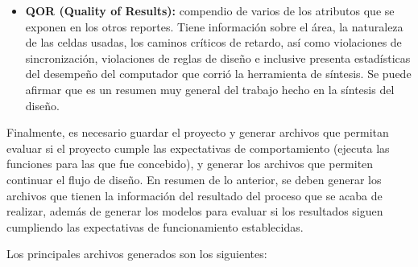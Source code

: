 \begin{itemize}
\item \textbf{QOR (Quality of Results):} {compendio de varios de los atributos que se exponen en los otros reportes. Tiene información sobre el área, la naturaleza de las celdas usadas, los caminos críticos de retardo, así como violaciones de sincronización, violaciones de reglas de diseño e inclusive presenta estadísticas del desempeño del computador que corrió la herramienta de síntesis. Se puede afirmar que es un resumen muy general del trabajo hecho en la síntesis del diseño.}
\end{itemize}

Finalmente, es necesario guardar el proyecto y generar archivos que permitan evaluar si el proyecto cumple las expectativas de comportamiento (ejecuta las funciones para las que fue concebido), y generar los archivos que permiten continuar el flujo de diseño. En resumen de lo anterior, se deben generar los archivos que tienen la información del resultado del proceso que se acaba de realizar, además de generar los modelos para evaluar si los resultados siguen cumpliendo las expectativas de funcionamiento establecidas.

Los principales archivos generados son los siguientes:

